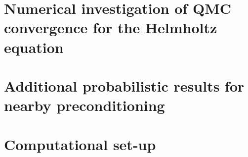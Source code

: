 \documentclass[11pt,draft]{book}
\begin{document}
\chapter[Numerical investigation of QMC]{Numerical investigation of QMC convergence for the Helmholtz equation}\label{app:hhqmcconv}


\chapter[Additional probabilistic results]{Additional probabilistic results for nearby preconditioning}\label{app:probnbpc}


\chapter{Computational set-up}\label{app:compsetup}




\end{document}
